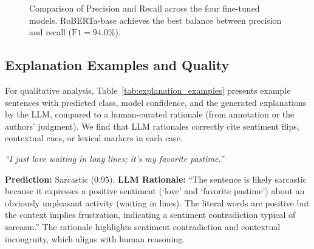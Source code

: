 \begin{figure}[htbp]
\centering
{}
\caption{Comparison of Precision and Recall across the four fine-tuned models. RoBERTa-base achieves the best balance between precision and recall ($\text{F1} = 94.0\%$).}
\label{fig:precision_recall}
\end{figure}

\subsection{Explanation Examples and Quality}\label{subsec:explanation_quality}

For qualitative analysis, Table~\ref{tab:explanation_examples} presents example sentences with predicted class, model confidence, and the generated explanations by the LLM, compared to a human-curated rationale (from annotation or the authors' judgment). We find that LLM rationales correctly cite sentiment flips, contextual cues, or lexical markers in each case.

\begin{example}
\emph{``I just love waiting in long lines; it's my favorite pastime.''}

\textbf{Prediction:} Sarcastic (0.95). \textbf{LLM Rationale:} ``The sentence is likely sarcastic because it expresses a positive sentiment (`love' and `favorite pastime') about an obviously unpleasant activity (waiting in lines). The literal words are positive but the context implies frustration, indicating a sentiment contradiction typical of sarcasm.'' The rationale highlights sentiment contradiction and contextual incongruity, which aligns with human reasoning.
\end{example}

